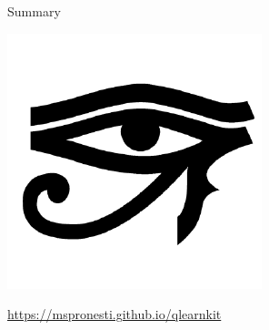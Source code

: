 \begin{frame}{Summary}
	
		  \vspace{\abovedisplayskip}
		\begin{minipage}[c]{0.2\textwidth}
			\centering
			\includegraphics[width=0.6\linewidth]{docs}
		\end{minipage}
		\begin{minipage}[c]{0.7\textwidth}
			\url{https://mspronesti.github.io/qlearnkit}
		\end{minipage}
		
    	\begin{center}\ccbysa\end{center}
    \end{frame}
